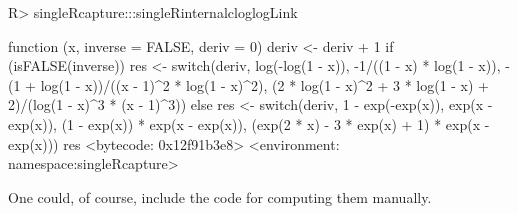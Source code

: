 \documentclass[nojss]{jss}
\newcommand{\1}{\mathcal{I}} \newcommand{\bZero}{\boldsymbol{0}}
\begin{document}
\begin{CodeChunk}
\begin{CodeInput}
R> singleRcapture:::singleRinternalcloglogLink
\end{CodeInput}
\begin{CodeOutput}
function (x, inverse = FALSE, deriv = 0)
{
    deriv <- deriv + 1
    if (isFALSE(inverse)) {
        res <- switch(deriv, log(-log(1 - x)), -1/((1 - x) *
            log(1 - x)), -(1 + log(1 - x))/((x - 1)^2 * log(1 -
            x)^2), (2 * log(1 - x)^2 + 3 * log(1 - x) + 2)/(log(1 -
            x)^3 * (x - 1)^3))
    }
    else {
        res <- switch(deriv, 1 - exp(-exp(x)), exp(x - exp(x)),
            (1 - exp(x)) * exp(x - exp(x)), (exp(2 * x) - 3 *
                exp(x) + 1) * exp(x - exp(x)))
    }
    res
}
<bytecode: 0x12f91b3e8>
<environment: namespace:singleRcapture>
\end{CodeOutput}
\end{CodeChunk}

\normalsize

One could, of course, include the code for computing them manually.


\end{document}
